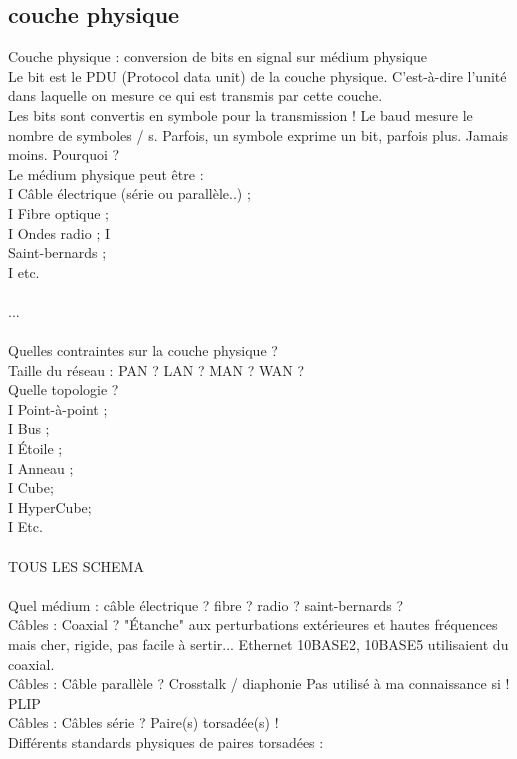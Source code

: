 \documentclass[5pt]{article}
\begin{document}
\begin{scriptsize}
\subsection{couche physique}
Couche physique : conversion de bits en signal sur médium physique\\
Le bit est le PDU (Protocol data unit) de la couche physique. C’est-à-dire l’unité dans laquelle on mesure ce qui est transmis par cette couche.\\
Les bits sont convertis en symbole pour la transmission ! Le baud mesure le nombre de symboles / s. Parfois, un symbole exprime un bit, parfois plus. Jamais moins. Pourquoi ?\\
Le médium physique peut être :\\
I Câble électrique (série ou parallèle..) ;\\
I Fibre optique ;\\
I Ondes radio ; I\\
Saint-bernards ;\\
I etc.\\
\\
...\\
\\
Quelles contraintes sur la couche physique ?\\
Taille du réseau : PAN ? LAN ? MAN ? WAN ?\\
Quelle topologie ?\\
I Point-à-point ;\\
I Bus ;\\
I Étoile ;\\
I Anneau ;\\
I Cube;\\
I HyperCube;\\
I Etc.\\ 
\\TOUS LES SCHEMA\\
\\
Quel médium : câble électrique ? fibre ? radio ? saint-bernards ?\\
Câbles : Coaxial ? "Étanche" aux perturbations extérieures et hautes fréquences mais cher, rigide, pas facile à sertir... Ethernet 10BASE2, 10BASE5 utilisaient du coaxial.\\
Câbles : Câble parallèle ? Crosstalk / diaphonie Pas utilisé à ma connaissance si ! PLIP\\
Câbles : Câbles série ? Paire(s) torsadée(s) !\\
Différents standards physiques de paires torsadées :\\

\end{scriptsize}
\end{document}

